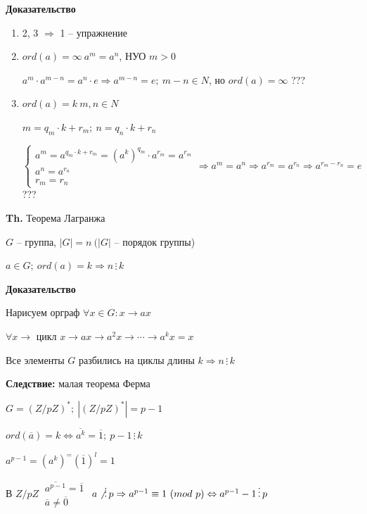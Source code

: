 \documentclass[14pt, letter paper]{article}
\begin{document}
\begin{center}
    \textbf{Доказательство}
\end{center}

\begin{enumerate}
    \item 2, 3 $\Rightarrow$ 1 -- упражнение

    \item $ord(a) = \infty\ a^m = a^n$, НУО $m > 0$

    $a^m \cdot a^{m-n} = a^n \cdot e \Rightarrow a^{m-n} = e;\ m - n \in N$, но $ord(a) = \infty$ ???

    \item $ord(a) = k\ m,n \in N$

    $m = q_m \cdot k + r_m;\ n = q_n \cdot k + r_n$

    $\begin{cases}
        a^m = a^{q_m \cdot k + r_m} = (a^k)^{q_m} \cdot a^{r_m} = a^{r_m} \\
        a^n = a^{r_n} \\
        r_m = r_n
    \end{cases} \Rightarrow a^m = a^n \Rightarrow a^{r_m} = a^{r_n} \Rightarrow a^{r_m - r_n} = e$ ???
\end{enumerate}

\textbf{Th.} Теорема Лагранжа 

$G$ -- группа, $|G| = n\ (|G|$ -- порядок группы)

$a \in G;\ ord(a) = k \Rightarrow n \, \vdots \, k$

\begin{center}
    \textbf{Доказательство}
\end{center}

Нарисуем орграф $\forall x \in G : x \rightarrow ax$

$\forall x \rightarrow$ цикл $x \rightarrow ax \rightarrow a^2x \rightarrow \cdots \rightarrow a^kx = x$

Все элементы $G$ разбились на циклы длины $k \Rightarrow n \, \vdots \, k$

\textbf{Следствие:} малая теорема Ферма

$G = (Z/pZ)^*;\ |(Z/pZ)^*| = p - 1$

$ord(\overline{a}) = k \Leftrightarrow \overline{a^k} = \overline{1};\ p - 1 \, \vdots \, k$

$a^{p-1} = (a^k)^ = (\overline{1})^l = 1$

В $Z/pZ\ \begin{gathered}
    \overline{a^{p-1}} = \overline{1} \\
    \overline{a} \neq \overline{0}
\end{gathered}$ $a \not\, \vdots \, p \Rightarrow a^{p-1} \equiv 1\ (mod\ p) \Leftrightarrow a^{p-1} - 1 \, \vdots \, p$
\end{document}

